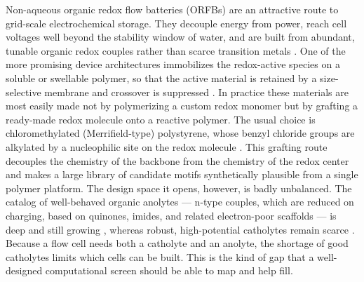 \documentclass[journal=jcisd8,manuscript=article]{achemso}
\begin{document}
Non-aqueous organic redox flow batteries (ORFBs) are an attractive route to grid-scale electrochemical storage. They decouple energy from power, reach cell voltages well beyond the stability window of water, and are built from abundant, tunable organic redox couples rather than scarce transition metals \cite{soloveichik2015}. One of the more promising device architectures immobilizes the redox-active species on a soluble or swellable polymer, so that the active material is retained by a size-selective membrane and crossover is suppressed \cite{janoschka2015}. In practice these materials are most easily made not by polymerizing a custom redox monomer but by grafting a ready-made redox molecule onto a reactive polymer. The usual choice is chloromethylated (Merrifield-type) polystyrene, whose benzyl chloride groups are alkylated by a nucleophilic site on the redox molecule \cite{merrifield1963}. This grafting route decouples the chemistry of the backbone from the chemistry of the redox center and makes a large library of candidate motifs synthetically plausible from a single polymer platform. The design space it opens, however, is badly unbalanced. The catalog of well-behaved organic anolytes — n-type couples, which are reduced on charging, based on quinones, imides, and related electron-poor scaffolds — is deep and still growing \cite{ding2018}, whereas robust, high-potential catholytes remain scarce \cite{kwon2019}. Because a flow cell needs both a catholyte and an anolyte, the shortage of good catholytes limits which cells can be built. This is the kind of gap that a well-designed computational screen should be able to map and help fill.
\end{document}
